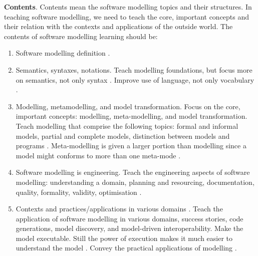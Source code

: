 \documentclass[a4paper]{Report}
\begin{document}
\textbf{Contents}. Contents mean the software modelling topics and their structures. In teaching software modelling, we need to teach the core, important concepts and their relation with the contexts and applications of the outside world. The contents of software modelling learning should be:
\begin{enumerate}
\item Software modelling definition \cite{borstler2012teaching}.
\item Semantics, syntaxes, notations. Teach modelling foundations, but focus more on semantics, not only syntax \cite{borstler2012teaching}. Improve use of language, not only vocabulary \cite{bezivin2009teaching}.
\item Modelling, metamodelling, and model transformation. Focus on the core, important concepts: modelling, meta-modelling, and model transformation. Teach modelling that comprise the following topics: formal and informal models, partial and complete models, distinction between models and programs \cite{bezivin2009teaching}. Meta-modelling is given a larger portion than modelling since a model might conforms to more than one meta-mode \cite{ober2007teaching}.
\item Software modelling is engineering. Teach the engineering aspects of software modelling: understanding a domain, planning and resourcing, documentation, quality, formality, validity, optimisation \cite{paige2014bad}.
\item Contexts and practices/applications in various domains \cite{paige2014bad}. Teach the application of software modelling in various domains, success stories, code generations, model discovery, and model-driven interoperability. Make the model executable. Still the power of execution makes it much easier to understand the model \cite{bezivin2009teaching}. Convey the practical applications of modelling \cite{borstler2012teaching}.
\end{enumerate}
\end{document}
